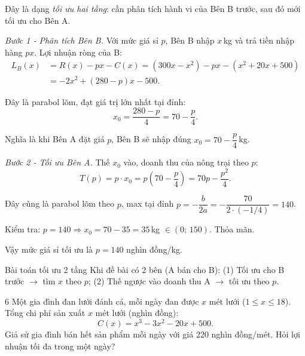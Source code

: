\begin{loigiai}
Đây là dạng \textit{tối ưu hai tầng}: cần phân tích hành vi của Bên B trước, sau đó mới tối ưu cho Bên A.

\textit{Bước 1 - Phân tích Bên B.} Với mức giá sỉ $p$, Bên B nhập $x$\,kg và trả tiền nhập hàng $px$. Lợi nhuận ròng của B:
\begin{align*}
L_B(x) &= R(x) - px - C(x) = (300x - x^2) - px - (x^2 + 20x + 500) \\
        &= -2x^2 + (280 - p)x - 500.
\end{align*}

Đây là parabol lõm, đạt giá trị lớn nhất tại đỉnh:
\[ x_0 = \frac{280 - p}{4} = 70 - \frac{p}{4}. \]

Nghĩa là khi Bên A đặt giá $p$, Bên B sẽ nhập đúng $x_0 = 70 - \dfrac{p}{4}$\,kg.

\textit{Bước 2 - Tối ưu Bên A.} Thế $x_0$ vào, doanh thu của nông trại theo $p$:
\[ T(p) = p \cdot x_0 = p\!\left(70 - \frac{p}{4}\right) = 70p - \frac{p^2}{4}. \]

Đây cũng là parabol lõm theo $p$, max tại đỉnh $p = -\dfrac{b}{2a} = -\dfrac{70}{2 \cdot (-1/4)} = 140$.

Kiểm tra: $p = 140 \Rightarrow x_0 = 70 - 35 = 35$\,kg $\in (0;\,150)$. Thỏa mãn.

Vậy mức giá sỉ tối ưu là $\boxed{p = 140}$ nghìn đồng/kg.
\end{loigiai}

\begin{meobotui}{Bài toán tối ưu 2 tầng}
Khi đề bài có 2 bên (A bán cho B): (1) Tối ưu cho B trước $\to$ tìm $x$ theo $p$; (2) Thế ngược vào doanh thu A $\to$ tối ưu theo $p$.
\end{meobotui}

\separator

\begin{baitoan}{6 \hfill {}}
Một gia đình đan lưới đánh cá, mỗi ngày đan được $x$ mét lưới ($1 \le x \le 18$). Tổng chi phí sản xuất $x$ mét lưới (nghìn đồng):
\[ C(x) = x^3 - 3x^2 - 20x + 500. \]
Giả sử gia đình bán hết sản phẩm mỗi ngày với giá 220 nghìn đồng/mét. Hỏi lợi nhuận tối đa trong một ngày?
\end{baitoan}

